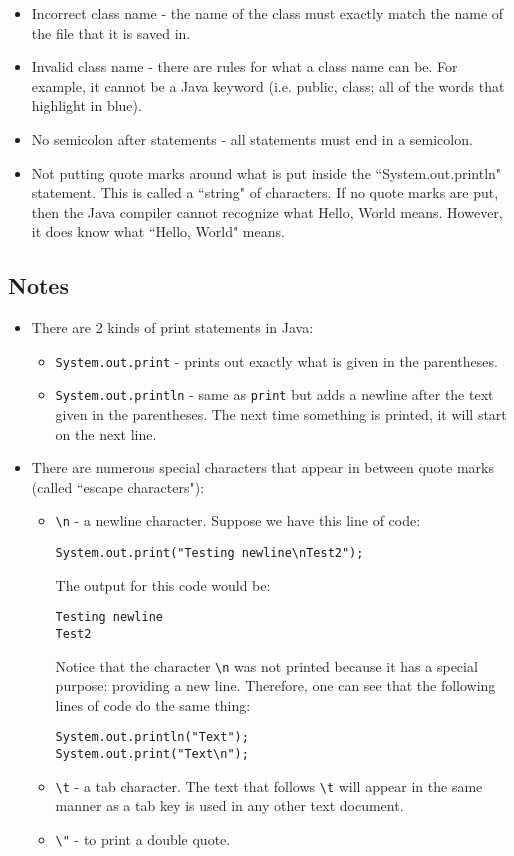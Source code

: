 \begin{itemize}
\item Incorrect class name - the name of the class must exactly match the name of the file that it is saved in. 
\item Invalid class name - there are rules for what a class name can be. For example, it cannot be a Java keyword (i.e. public, class; all of the words that highlight in blue).
\item No semicolon after statements - all statements must end in a semicolon.
\item Not putting quote marks around what is put inside the ``System.out.println" statement. This is called a ``string" of characters. If no quote marks are put, then the Java compiler cannot recognize what Hello, World means. However, it does know what ``Hello, World" means.  
\end{itemize}

\subsection{Notes}
\begin{itemize}
\item There are 2 kinds of print statements in Java:
\begin{itemize}
\item \verb|System.out.print| - prints out exactly what is given in the parentheses.
\item \verb|System.out.println| - same as \verb|print| but adds a newline after the text given in the parentheses. The next time something is printed, it will start on the next line.
\end{itemize}

\item There are numerous special characters that appear in between quote marks (called ``escape characters"):
\begin{itemize}
\item \verb|\n| - a newline character. Suppose we have this line of code:
\begin{lstlisting}
System.out.print("Testing newline\nTest2");
\end{lstlisting}
The output for this code would be:
\begin{verbatim}
Testing newline
Test2
\end{verbatim}
Notice that the character \verb|\n| was not printed because it has a special purpose: providing a new line. Therefore, one can see that the following lines of code do the same thing:
\begin{verbatim}
System.out.println("Text");
System.out.print("Text\n");
\end{verbatim}
\item \verb|\t| - a tab character. The text that follows \verb|\t| will appear in the same manner as a tab key is used in any other text document.
\item \verb|\"| - to print a double quote.
\end{itemize}
\end{itemize}

